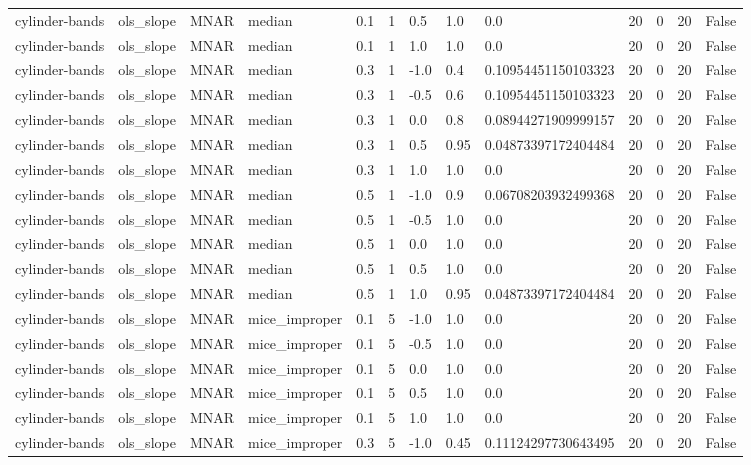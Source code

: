 \begin{tabular}{lllllllllllll}
cylinder-bands & ols\_slope & MNAR & median & 0.1 & 1 & 0.5 & 1.0 & 0.0 & 20 & 0 & 20 & False \\
cylinder-bands & ols\_slope & MNAR & median & 0.1 & 1 & 1.0 & 1.0 & 0.0 & 20 & 0 & 20 & False \\
cylinder-bands & ols\_slope & MNAR & median & 0.3 & 1 & -1.0 & 0.4 & 0.10954451150103323 & 20 & 0 & 20 & False \\
cylinder-bands & ols\_slope & MNAR & median & 0.3 & 1 & -0.5 & 0.6 & 0.10954451150103323 & 20 & 0 & 20 & False \\
cylinder-bands & ols\_slope & MNAR & median & 0.3 & 1 & 0.0 & 0.8 & 0.08944271909999157 & 20 & 0 & 20 & False \\
cylinder-bands & ols\_slope & MNAR & median & 0.3 & 1 & 0.5 & 0.95 & 0.04873397172404484 & 20 & 0 & 20 & False \\
cylinder-bands & ols\_slope & MNAR & median & 0.3 & 1 & 1.0 & 1.0 & 0.0 & 20 & 0 & 20 & False \\
cylinder-bands & ols\_slope & MNAR & median & 0.5 & 1 & -1.0 & 0.9 & 0.06708203932499368 & 20 & 0 & 20 & False \\
cylinder-bands & ols\_slope & MNAR & median & 0.5 & 1 & -0.5 & 1.0 & 0.0 & 20 & 0 & 20 & False \\
cylinder-bands & ols\_slope & MNAR & median & 0.5 & 1 & 0.0 & 1.0 & 0.0 & 20 & 0 & 20 & False \\
cylinder-bands & ols\_slope & MNAR & median & 0.5 & 1 & 0.5 & 1.0 & 0.0 & 20 & 0 & 20 & False \\
cylinder-bands & ols\_slope & MNAR & median & 0.5 & 1 & 1.0 & 0.95 & 0.04873397172404484 & 20 & 0 & 20 & False \\
cylinder-bands & ols\_slope & MNAR & mice\_improper & 0.1 & 5 & -1.0 & 1.0 & 0.0 & 20 & 0 & 20 & False \\
cylinder-bands & ols\_slope & MNAR & mice\_improper & 0.1 & 5 & -0.5 & 1.0 & 0.0 & 20 & 0 & 20 & False \\
cylinder-bands & ols\_slope & MNAR & mice\_improper & 0.1 & 5 & 0.0 & 1.0 & 0.0 & 20 & 0 & 20 & False \\
cylinder-bands & ols\_slope & MNAR & mice\_improper & 0.1 & 5 & 0.5 & 1.0 & 0.0 & 20 & 0 & 20 & False \\
cylinder-bands & ols\_slope & MNAR & mice\_improper & 0.1 & 5 & 1.0 & 1.0 & 0.0 & 20 & 0 & 20 & False \\
cylinder-bands & ols\_slope & MNAR & mice\_improper & 0.3 & 5 & -1.0 & 0.45 & 0.11124297730643495 & 20 & 0 & 20 & False \\

\end{tabular}
